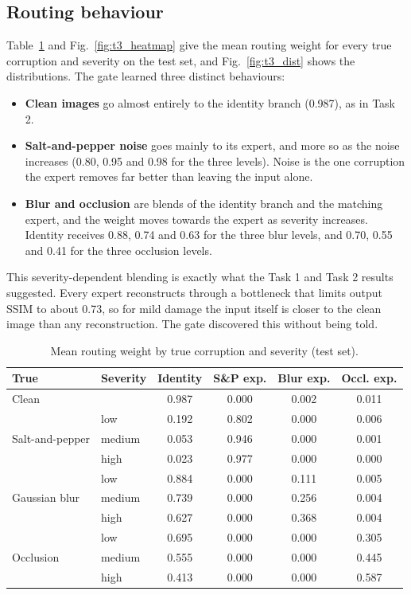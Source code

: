 \documentclass[conference]{IEEEtran}
\begin{document}
\subsection{Routing behaviour}
Table~\ref{tab:t3_routing} and Fig.~\ref{fig:t3_heatmap} give the mean routing weight for every true corruption and severity on the test set, and Fig.~\ref{fig:t3_dist} shows the distributions. The gate learned three distinct behaviours:
\begin{itemize}
\item \textbf{Clean images} go almost entirely to the identity branch (0.987), as in Task 2.
\item \textbf{Salt-and-pepper noise} goes mainly to its expert, and more so as the noise increases (0.80, 0.95 and 0.98 for the three levels). Noise is the one corruption the expert removes far better than leaving the input alone.
\item \textbf{Blur and occlusion} are blends of the identity branch and the matching expert, and the weight moves towards the expert as severity increases. Identity receives 0.88, 0.74 and 0.63 for the three blur levels, and 0.70, 0.55 and 0.41 for the three occlusion levels.
\end{itemize}
This severity-dependent blending is exactly what the Task 1 and Task 2 results suggested. Every expert reconstructs through a bottleneck that limits output SSIM to about 0.73, so for mild damage the input itself is closer to the clean image than any reconstruction. The gate discovered this without being told.

\begin{table}[t]
\centering
\caption{Mean routing weight by true corruption and severity (test set).}
\label{tab:t3_routing}
\footnotesize
\setlength{\tabcolsep}{4pt}
\begin{tabular}{@{}llcccc@{}}
\toprule
True & Severity & Identity & S\&P exp. & Blur exp. & Occl. exp. \\
\midrule
Clean & & 0.987 & 0.000 & 0.002 & 0.011 \\
\midrule
\multirow{3}{*}{Salt-and-pepper} & low & 0.192 & 0.802 & 0.000 & 0.006 \\
 & medium & 0.053 & 0.946 & 0.000 & 0.001 \\
 & high & 0.023 & 0.977 & 0.000 & 0.000 \\
\midrule
\multirow{3}{*}{Gaussian blur} & low & 0.884 & 0.000 & 0.111 & 0.005 \\
 & medium & 0.739 & 0.000 & 0.256 & 0.004 \\
 & high & 0.627 & 0.000 & 0.368 & 0.004 \\
\midrule
\multirow{3}{*}{Occlusion} & low & 0.695 & 0.000 & 0.000 & 0.305 \\
 & medium & 0.555 & 0.000 & 0.000 & 0.445 \\
 & high & 0.413 & 0.000 & 0.000 & 0.587 \\
\bottomrule
\end{tabular}
\end{table}
\end{document}
